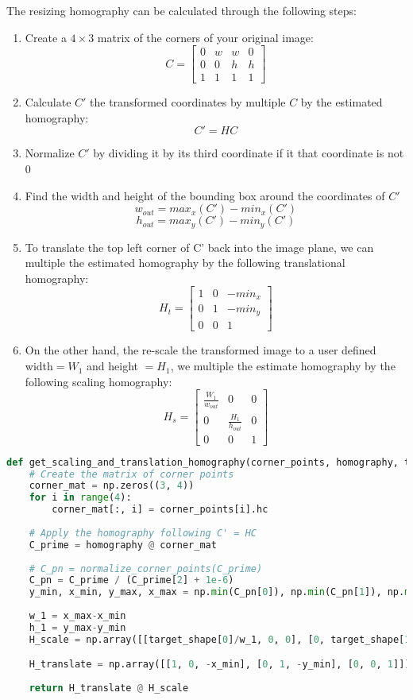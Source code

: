 \documentclass{article}
\begin{document}
The resizing homography can be calculated through the following steps:
\begin{enumerate}
    \item Create a $4 \times 3$ matrix of the corners of your original image: 
        \[C = \begin{bmatrix}
            0 & w & w & 0 \\
            0 & 0 & h & h \\
            1 & 1 & 1 & 1
        \end{bmatrix}\]
    \item Calculate $C'$ the transformed coordinates by multiple $C$ by the estimated homography:
        \[C' = H C\]
    \item Normalize $C'$ by dividing it by its third coordinate if it that coordinate is not 0
    \item Find the width and height of the bounding box around the coordinates of $C'$
        \[w_{out} = max_x(C') - min_x(C')\]
        \[h_{out} = max_y(C') - min_y(C')\]
    \item To translate the top left corner of C' back into the image plane, we can multiple the estimated homography by the following translational homography:
        \[H_t = \begin{bmatrix}
            1 & 0 & -min_x \\
            0 & 1 & -min_y \\
            0 & 0 & 1
        \end{bmatrix}\]
    \item On the other hand, the re-scale the transformed image to a user defined width$=W_1$ and height $=H_1$, we multiple the estimate homography by the following scaling homography:
        \[H_s = \begin{bmatrix}
            \frac{W_1}{w_{out}} & 0 & 0 \\
            0 & \frac{H_1}{h_{out}} & 0 \\
            0 & 0 & 1
        \end{bmatrix}\]
\end{enumerate}

\begin{lstlisting}[language=Python]
def get_scaling_and_translation_homography(corner_points, homography, target_shape):
    # Create the matrix of corner points
    corner_mat = np.zeros((3, 4))
    for i in range(4):
        corner_mat[:, i] = corner_points[i].hc
    
    # Apply the homography following C' = HC
    C_prime = homography @ corner_mat
    
    # C_pn = normalize_corner_points(C_prime)
    C_pn = C_prime / (C_prime[2] + 1e-6)
    y_min, x_min, y_max, x_max = np.min(C_pn[0]), np.min(C_pn[1]), np.max(C_pn[0]), np.max(C_pn[1])
    
    w_1 = x_max-x_min
    h_1 = y_max-y_min
    H_scale = np.array([[target_shape[0]/w_1, 0, 0], [0, target_shape[1]/h_1, 0], [0,0,1]])

    H_translate = np.array([[1, 0, -x_min], [0, 1, -y_min], [0, 0, 1]])
    
    return H_translate @ H_scale
\end{lstlisting}
\end{document}
